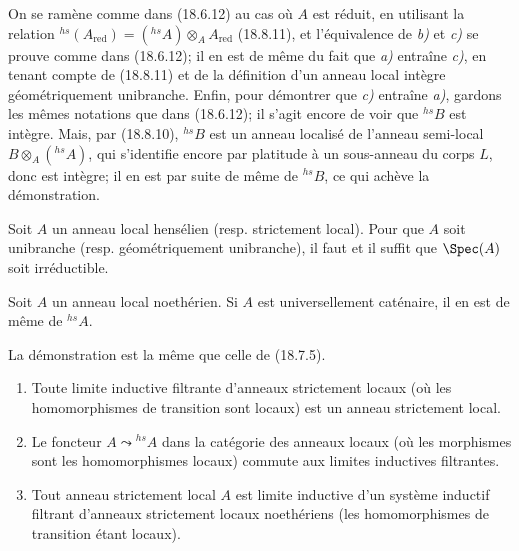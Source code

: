 On se ramène comme dans (18.6.12) au cas où $A$ est réduit, en utilisant la relation ${}^{hs}(A_{\mathrm{red}})=({}^{hs}\!A)\otimes_A A_{\mathrm{red}}$ (18.8.11), et l'équivalence de \emph{b)} et \emph{c)} se prouve comme dans (18.6.12); il en est de même du fait que \emph{a)} entraîne \emph{c)}, en tenant compte de (18.8.11) et de la définition d'un anneau local intègre géométriquement unibranche. Enfin, pour démontrer que \emph{c)} entraîne \emph{a)}, gardons les mêmes notations que dans (18.6.12); il s'agit encore de voir que ${}^{hs}\!B$ est intègre. Mais, par (18.8.10), ${}^{hs}\!B$ est un anneau localisé de l'anneau semi-local $B\otimes_A({}^{hs}\!A)$, qui s'identifie encore par platitude à un sous-anneau du corps $L$, donc est intègre; il en est par suite de même de ${}^{hs}\!B$, ce qui achève la démonstration.

\begin{corollary}[18.8.16]
\label{IV.18.8.16}
Soit $A$ un anneau local hensélien \textup{(resp.} strictement local\textup{)}. Pour que $A$ soit unibranche \textup{(resp.} géométriquement unibranche\textup{)}, il faut et il suffit que $\Spec(A)$ soit irréductible.
\end{corollary}


\begin{proposition}[18.8.17]
\label{IV.18.8.17}
Soit $A$ un anneau local noethérien. Si $A$ est universellement caténaire, il en est de même de ${}^{hs}\!A$.
\end{proposition}

La démonstration est la même que celle de (18.7.5).

\begin{proposition}[18.8.18]
\label{IV.18.8.18}
\begin{enumerate}
  \item[\textup{(i)}] Toute limite inductive filtrante d'anneaux strictement locaux (où les homomorphismes de transition sont locaux) est un anneau strictement local.
  \item[\textup{(ii)}] Le foncteur $A\leadsto{}^{hs}\!A$ dans la catégorie des anneaux locaux (où les morphismes sont les homomorphismes locaux) commute aux limites inductives filtrantes.
  \item[\textup{(iii)}] Tout anneau strictement local $A$ est limite inductive d'un système inductif filtrant d'anneaux strictement locaux noethériens (les homomorphismes de transition étant locaux).
\end{enumerate}
\end{proposition}

